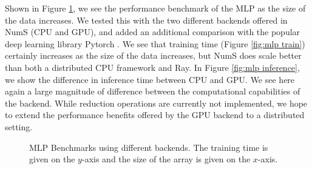 \documentclass{article}
\begin{document}
Shown in Figure \ref{fig:mlp bench}, we see the performance benchmark of the MLP as the size of the data increases. We tested this with the two different backends offered in NumS (CPU and GPU), and added an additional comparison with the popular deep learning library Pytorch \cite{NEURIPS2019_9015}. We see that training time (Figure \ref{fig:mlp train}) certainly increases as the size of the data increases, but NumS does scale better than both a distributed CPU framework and Ray. In Figure \ref{fig:mlp inference}, we show the difference in inference time between CPU and GPU. We see here again a large magnitude of difference between the computational capabilities of the backend. While reduction operations are currently not implemented, we hope to extend the performance benefits offered by the GPU backend to a distributed setting.

\begin{figure}
	\centering

	\qquad
	\caption{MLP Benchmarks using different backends. The training time is given on the $y$-axis and the size of the array is given on the $x$-axis.}
	\label{fig:mlp bench}
\end{figure}
\end{document}
